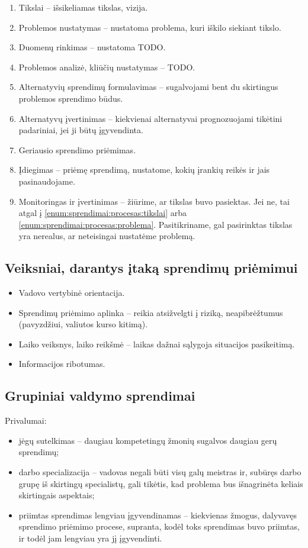 \begin{enumerate}
  \item \label{enum:sprendimai:procesas:tikslai} Tikslai – išsikeliamas
    tikslas, vizija.
  \item \label{enum:sprendimai:procesas:problema} Problemos nustatymas
    – nustatoma problema, kuri iškilo siekiant tikslo.
  \item Duomenų rinkimas – nustatoma TODO.
  \item Problemos analizė, kliūčių nustatymas – TODO.
  \item Alternatyvių sprendimų formulavimas – sugalvojami bent du
    skirtingus problemos sprendimo būdus.
  \item Alternatyvų įvertinimas – kiekvienai alternatyvai prognozuojami
    tikėtini padariniai, jei ji būtų įgyvendinta.
  \item Geriausio sprendimo priėmimas.
  \item Įdiegimas – priėmę sprendimą, nustatome, kokių įrankių reikės
    ir jais pasinaudojame.
  \item Monitoringas ir įvertinimas – žiūrime, ar tikslas buvo pasiektas.
    Jei ne, tai atgal į \ref{enum:sprendimai:procesas:tikslai} arba
    \ref{enum:sprendimai:procesas:problema}. Pasitikriname, gal pasirinktas
    tikslas yra nerealus, ar neteisingai nustatėme problemą.
\end{enumerate}

\subsection{Veiksniai, darantys įtaką sprendimų priėmimui}

\begin{itemize}
  \item Vadovo vertybinė orientacija.
  \item Sprendimų priėmimo aplinka – reikia atsižvelgti į riziką,
    neapibrėžtumus (pavyzdžiui, valiutos kurso kitimą).
  \item Laiko veiksnys, laiko reikšmė – laikas dažnai sąlygoja situacijos
    pasikeitimą.
  \item Informacijos ribotumas.
\end{itemize}

\subsection{Grupiniai valdymo sprendimai}

Privalumai:
\begin{itemize}
  \item jėgų sutelkimas – daugiau kompetetingų žmonių sugalvos daugiau
    gerų sprendimų;
  \item darbo specializacija – vadovas negali būti visų galų meistras
    ir, subūręs darbo grupę iš skirtingų specialistų, gali tikėtis,
    kad problema bus išnagrinėta keliais skirtingais aspektais;
  \item priimtas sprendimas lengviau įgyvendinamas – kiekvienas žmogus,
    dalyvavęs sprendimo priėmimo procese, supranta, kodėl toks sprendimas
    buvo priimtas, ir todėl jam lengviau yra jį įgyvendinti.
\end{itemize}

